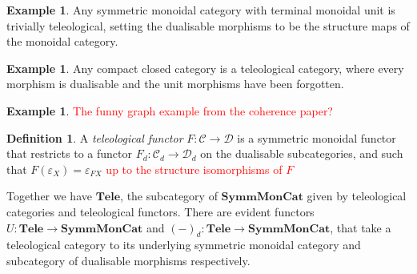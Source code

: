 \documentclass[11pt,a4paper]{article}
\theoremstyle{plain}
\theoremstyle{definition}
\newtheorem{definition}[theorem]{Definition}
\newtheorem{example}[theorem]{Example}
\newcommand{\C}{\mathscr{C}}
\newcommand{\D}{\mathscr{D}}
\newcommand{\SymmMonCat}{\mathbf{SymmMonCat}}
\newcommand{\Tele}{\mathbf{Tele}}
\newcommand{\todo}[1]{\textcolor{red}{\small #1}}
\begin{document}
\begin{example}
  Any symmetric monoidal category with terminal monoidal unit is trivially teleological, setting the dualisable morphisms to be the structure maps of the monoidal category.
\end{example}

\begin{example}
  Any compact closed category is a teleological category, where every morphism is dualisable and the unit morphisms have been forgotten.
\end{example}

\begin{example}
  \todo{The funny graph example from the coherence paper?}
\end{example}

\begin{definition}
  A \emph{teleological functor} $F : \C \to \D$ is a symmetric monoidal functor that restricts to a functor $F_d : \C_d \to \D_d$ on the dualisable subcategories, and such that $F(\varepsilon_X) = \varepsilon_{FX}$ \todo{up to the structure isomorphisms of $F$}
\end{definition}

Together we have $\Tele$, the subcategory of $\SymmMonCat$ given by teleological categories and teleological functors. There are evident functors $U : \Tele \to \SymmMonCat$ and ${(-)}_d : \Tele \to \SymmMonCat$, that take a teleological category to its underlying symmetric monoidal category and subcategory of dualisable morphisms respectively.
\end{document}
